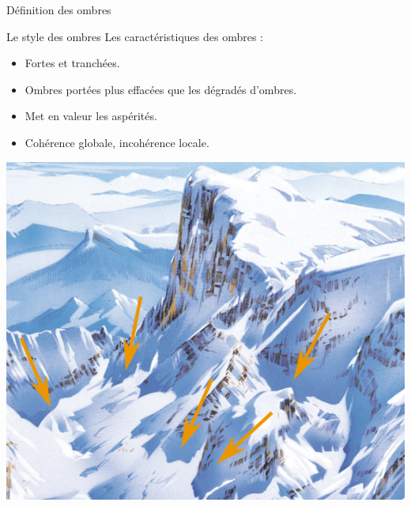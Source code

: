 \documentclass{beamer}
\begin{document}
\begin{frame}{Définition des ombres}
\end{frame}


\begin{frame}{Le style des ombres}
	Les caractéristiques des ombres : 
	\begin{itemize}
	\item Fortes et tranchées.
	\item Ombres portées plus effacées que les dégradés d'ombres.
	\item Met en valeur les aspérités.
	\item Cohérence globale, incohérence locale. 
	\end{itemize}
	\begin{center}
	\begin{minipage}[c]{0.45\linewidth}
    \begin{center}
    	\includegraphics[width=0.9\linewidth]{Images/PN_zoom_ombre_2.png}\\
    \end{center}
    \end{minipage}

\end{center}
\end{frame}
\end{document}
